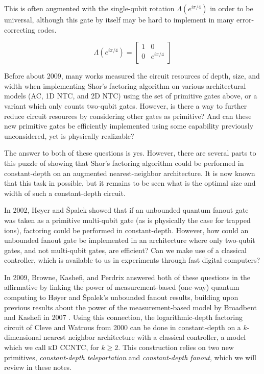 \documentclass{article}
\begin{document}
This is often augmented with the single-qubit rotation $\Lambda(e^{i\pi/4})$
in order to be universal, although this gate by itself may be hard to
implement in many error-correcting codes.

\begin{equation}
\Lambda(e^{i\pi/4}) = 
 \left[
  \begin{array}{cc}
    1 & 0 \\
    0 & e^{i\pi/4} \\
  \end{array} \right]
\end{equation}

Before about 2009, many works measured the circuit resources of
depth, size, and width when implementing Shor's
factoring algorithm \cite{Zalka1998} \cite{Zalka2006} \cite{Kutin2006}
\cite{Fowler2004}
on various architectural models (AC, 1D NTC, and 2D NTC)
\cite{VanMeter2006}
using the set of primitive gates above, or a variant which only counts
two-qubit gates. However, is there a way to further reduce circuit
resources by considering other gates as primitive? And can these new primitive
gates be efficiently implemented using some capability previously
unconsidered, yet is physically realizable?

The answer to both of these questions is yes. However, there are several parts
to this puzzle
of showing that Shor's factoring algorithm could be performed in constant-depth
on an augmented nearest-neighbor architecture. It is now known that this task
in possible, but it remains to be seen what is the optimal size and width of
such a constant-depth circuit.

In 2002, H{\o}yer and {\v S}palek showed that if an unbounded quantum
fanout gate was taken as a primitive multi-qubit gate (as is physically
the case for trapped ions),
factoring could be performed in constant-depth. However, how could an
unbounded fanout gate be implemented in an architecture where only two-qubit
gates, and not multi-qubit gates, are efficient? Can we make use
of a classical controller, which is available to us in experiments
through fast digital computers?

In 2009, Browne, Kashefi, and Perdrix answered
both of these questions in the affirmative by
linking the power of measurement-based (one-way) quantum computing to
H{\o}yer and {\v S}palek's unbounded fanout results, building upon previous
results about the power of the measurement-based model by Broadbent
and Kashefi in 2007 \cite{Broadbent2007}. Using this connection,
the logarithmic-depth factoring circuit of Cleve and Watrous from
2000 \cite{Cleve2000}
can be done in constant-depth on a $k$-dimensional
nearest neighbor architecture with a
classical controller, a model which we call \textsc{kD CCNTC}, for $k \ge 2$.
This construction
relies on two new primitives,
\emph{constant-depth teleportation} and \emph{constant-depth fanout}, which
we will review in these notes.
\end{document}
